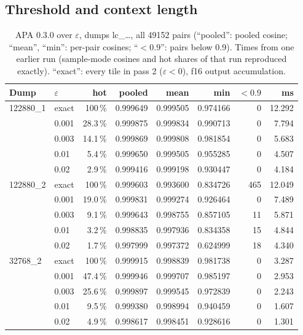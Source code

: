 \documentclass[10pt,twocolumn]{article}
\newcommand{\eps}{\varepsilon}
\begin{document}
\subsection{Threshold and context length}

\begin{table}[t]
\centering\footnotesize
\setlength{\tabcolsep}{2pt}
\begin{tabular}{@{}llrrrrrr@{}}
\toprule
Dump & $\eps$ & hot & pooled & mean & min & $<0.9$ & ms \\
\midrule
122880\_1 & exact & 100\,\% & 0.999649 & 0.999505 & 0.974166 & 0 & 12.292 \\
 & 0.001 & 28.3\,\% & 0.999875 & 0.999834 & 0.990713 & 0 & 7.794 \\
 & 0.003 & 14.1\,\% & 0.999869 & 0.999808 & 0.981854 & 0 & 5.683 \\
 & 0.01 & 5.4\,\% & 0.999650 & 0.999505 & 0.955285 & 0 & 4.507 \\
 & 0.02 & 2.9\,\% & 0.999416 & 0.999198 & 0.930447 & 0 & 4.184 \\
\midrule
122880\_2 & exact & 100\,\% & 0.999603 & 0.993600 & 0.834726 & 465 & 12.049 \\
 & 0.001 & 19.0\,\% & 0.999831 & 0.999274 & 0.926464 & 0 & 7.489 \\
 & 0.003 & 9.1\,\% & 0.999643 & 0.998755 & 0.857105 & 11 & 5.871 \\
 & 0.01 & 3.2\,\% & 0.998835 & 0.997936 & 0.834358 & 15 & 4.844 \\
 & 0.02 & 1.7\,\% & 0.997999 & 0.997372 & 0.624999 & 18 & 4.340 \\
\midrule
32768\_2 & exact & 100\,\% & 0.999915 & 0.998839 & 0.981738 & 0 & 3.287 \\
 & 0.001 & 47.4\,\% & 0.999946 & 0.999707 & 0.985197 & 0 & 2.953 \\
 & 0.003 & 25.6\,\% & 0.999897 & 0.999545 & 0.972839 & 0 & 2.243 \\
 & 0.01 & 9.5\,\% & 0.999380 & 0.998994 & 0.940459 & 0 & 1.607 \\
 & 0.02 & 4.9\,\% & 0.998617 & 0.998451 & 0.928616 & 0 & 1.301 \\
\bottomrule
\end{tabular}
\caption{APA 0.3.0 over $\eps$, dumps lc\_\ldots, all 49152 pairs (``pooled'': pooled cosine; ``mean'', ``min'': per-pair
cosines; ``$<0.9$'': pairs below 0.9). Times from one earlier run (sample-mode cosines and hot shares of that
run reproduced exactly). ``exact'': every tile in pass 2 ($\eps<0$), f16 output accumulation.}
\label{tab:eps}
\end{table}
\end{document}
